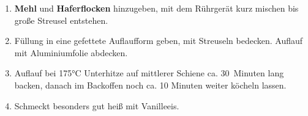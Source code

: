 \documentclass[11pt,a4paper]{article}
\begin{document}
\begin{multicols}{2}
\begin{enumerate}
		\item \textbf{Mehl} und \textbf{Haferflocken} hinzugeben, mit dem Rührgerät kurz mischen bis große Streusel entstehen.
		\item Füllung in eine gefettete Auflaufform geben, mit Streuseln bedecken. Auflauf mit Aluminiumfolie abdecken.
		\item Auflauf bei 175°C Unterhitze auf mittlerer Schiene ca. 30~Minuten lang backen, danach im Backoffen noch ca. 10 Minuten weiter köcheln lassen.
		\item Schmeckt besonders gut heiß mit Vanilleeis.
	\end{enumerate}
	\end{multicols}
\end{document}
